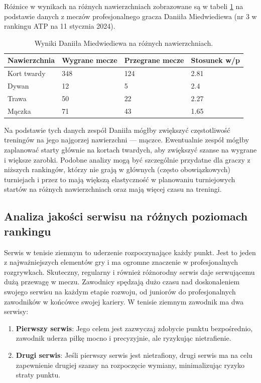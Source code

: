 \documentclass[12pt, a4paper]{article}
\begin{document}
Różnice w wynikach na różnych nawierzchniach zobrazowane są w tabeli \ref{tab:surfaces} na podstawie danych z meczów profesjonalnego gracza Daniiła Miedwiediewa (nr 3 w rankingu ATP na 11 stycznia 2024).
\begin{table}[h]
    \footnotesize
    \centering
    \begin{tabular}{l l l l} 
        \hline
        \textbf{Nawierzchnia} & \textbf{Wygrane mecze} & \textbf{Przegrane mecze} & \textbf{Stosunek w/p} \\
        \hline
        Kort twardy & 348 & 124 & 2.81 \\ 
        Dywan & 12 & 5 & 2.4 \\
        Trawa & 50 & 22 & 2.27 \\
        Mączka & 71 & 43 & 1.65 \\ 
        \hline
    \end{tabular}
    \caption{Wyniki Daniiła Miedwiediewa na różnych nawierzchniach.}
    \label{tab:surfaces}
\end{table}
Na podstawie tych danych zespół Daniiła mógłby zwiększyć częstotliwość treningów na jego najgorzej nawierzchni --- mączce. Ewentualnie zespół mógłby zaplanować starty głównie na kortach twardych, aby zwiększyć szanse na wygrane i większe zarobki. Podobne analizy mogą być szczególnie przydatne dla graczy z niższych rankingów, którzy nie grają w głównych (często obowiązkowych) turniejach i przez to mają większą elastyczność w planowaniu turniejowych startów na różnych nawierzchniach oraz mają więcej czasu na treningi.


\subsection{Analiza jakości serwisu na różnych poziomach rankingu}
Serwis w tenisie ziemnym to uderzenie rozpoczynające każdy punkt. Jest to jeden z najważniejszych elementów gry i ma ogromne znaczenie w profesjonalnych rozgrywkach. Skuteczny, regularny i również różnorodny serwis daje serwującemu dużą przewagę w meczu. Zawodnicy spędzają dużo czasu nad doskonaleniem swojego serwisu na każdym etapie rozwoju, od juniorów do profesjonalnych zawodników w końcówce swojej kariery. W tenisie ziemnym zawodnik ma dwa serwisy:
\begin{enumerate}
    \item \textbf{Pierwszy serwis}: Jego celem jest zazwyczaj zdobycie punktu bezpośrednio, zawodnik uderza piłkę mocno i precyzyjnie, ale ryzykując nietrafienie.
    \item \textbf{Drugi serwis}: Jeśli pierwszy serwis jest nietrafiony, drugi serwis ma na celu zapewnienie drugiej szansy na rozpoczęcie wymiany, minimalizując ryzyko straty punktu.
\end{enumerate}
\end{document}
